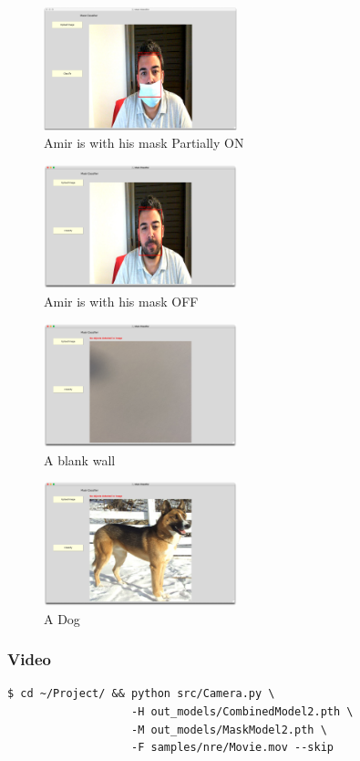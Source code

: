 \begin{figure}[H]
    \centering
    \includegraphics[width=0.5\textwidth]{images/Demo/Partial.png}
    \caption{Amir is with his mask Partially ON}
    \label{fig:PartialMaskedAmir}
\end{figure}
\begin{figure}[H]
    \centering
    \includegraphics[width=0.5\textwidth]{images/Demo/Unmasked.png}
    \caption{Amir is with his mask OFF}
    \label{fig:UnMaskedAmir}
\end{figure}
\begin{figure}[H]
    \centering
    \includegraphics[width=0.5\textwidth]{images/Demo/wall.png}
    \caption{A blank wall}
    \label{fig:Wall}
\end{figure}
\begin{figure}[H]
    \centering
    \includegraphics[width=0.5\textwidth]{images/Demo/dog.png}
    \caption{A Dog}
    \label{fig:Dog}
\end{figure}
\subsubsection{Video}
\begin{verbatim}
$ cd ~/Project/ && python src/Camera.py \
                   -H out_models/CombinedModel2.pth \
                   -M out_models/MaskModel2.pth \
                   -F samples/nre/Movie.mov --skip
\end{verbatim}

